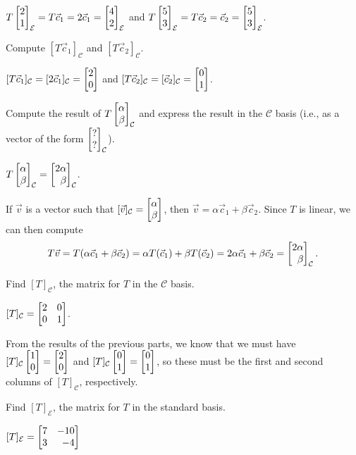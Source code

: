 \documentclass{workbook}
\begin{document}
\begin{slide}
\begin{parts}[resume]
			\begin{solution}[inline]
				$T\mat{2\\1}_{\mathcal E}=T\vec c_1=2\vec c_1=\mat{4\\2}_{\mathcal E}$ and
				$T\mat{5\\3}_{\mathcal E}=T\vec c_2=\vec c_2=\mat{5\\3}_{\mathcal E}$.
			\end{solution}
		\item Compute $[T\vec c_1]_{\mathcal C}$ and $[T\vec c_2]_{\mathcal C}$.
			\begin{solution}[inline]
				$[T\vec c_1]_{\mathcal C}=[2\vec c_1]_{\mathcal C}=\mat{2\\0}$ and
				$[T\vec c_2]_{\mathcal C}=[\vec c_2]_{\mathcal C}=\mat{0\\1}$.
			\end{solution}
		\item Compute the result of $T\mat{\alpha\\\beta}_{\mathcal C}$ and express the result in the
			$\mathcal C$ basis (i.e., as a vector of the form $\mat{?\\?}_{\mathcal C}$).
			\begin{solution}
				$T\mat{\alpha\\\beta}_{\mathcal C}=\mat{2\alpha\\\beta}_{\mathcal C}$.

				If $\vec v$ is a vector such that
				$[\vec v]_{\mathcal C}=\mat{\alpha\\\beta}$, then
				$\vec v=\alpha\vec c_1+\beta\vec c_2$. Since $T$ is linear, we can
				then compute
				\[
					T\vec v
					=T(\alpha\vec c_1+\beta\vec c_2)
					=\alpha T(\vec c_1)+\beta T(\vec c_2)
					=2\alpha\vec c_1+\beta\vec c_2
					=\mat{2\alpha\\\beta}_{\mathcal C}.
				\]
			\end{solution}
		\item Find $[T]_{\mathcal C}$, the matrix for $T$ in the $\mathcal C$ basis.
			\begin{solution}
				$[T]_{\mathcal C}=\mat{2&0\\0&1}$.

				From the results of the previous parts, we know that we must have
				$[T]_{\mathcal C}\mat{1\\0}=\mat{2\\0}$ and
				$[T]_{\mathcal C}\mat{0\\1}=\mat{0\\1}$, so these
				must be the first and second columns of $[T]_{\mathcal C}$, respectively.
			\end{solution}
		\item Find $[T]_{\mathcal E}$, the matrix for $T$ in the standard basis.
			\begin{solution}
				$[T]_{\mathcal E}=\mat{7&-10\\3&-4}$


\end{solution}
\end{parts}
\end{slide}
\end{document}

